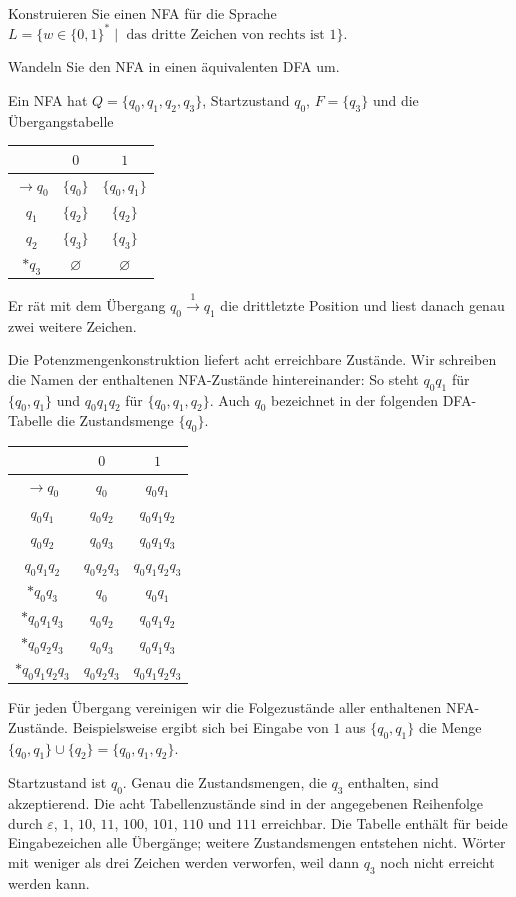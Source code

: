 \\
Konstruieren Sie einen NFA für die Sprache
$L = \{ w \in \{0,1\}^* \mid \text{ das dritte Zeichen von rechts ist } 1 \}$.

Wandeln Sie den NFA in einen äquivalenten DFA um.

\begin{loesung}

Ein NFA hat $Q=\{q_0,q_1,q_2,q_3\}$, Startzustand $q_0$,
$F=\{q_3\}$ und die Übergangstabelle
\begin{center}
\begin{tabular}{c|cc}
 & $0$ & $1$\\\hline
$\to q_0$ & $\{q_0\}$ & $\{q_0,q_1\}$\\
$q_1$ & $\{q_2\}$ & $\{q_2\}$\\
$q_2$ & $\{q_3\}$ & $\{q_3\}$\\
$*q_3$ & $\varnothing$ & $\varnothing$
\end{tabular}
\end{center}
Er rät mit dem Übergang $q_0\xrightarrow{1}q_1$ die drittletzte Position
und liest danach genau zwei weitere Zeichen.

Die Potenzmengenkonstruktion liefert acht erreichbare Zustände.
Wir schreiben die Namen der enthaltenen NFA-Zustände hintereinander:
So steht $q_0q_1$ für $\{q_0,q_1\}$ und $q_0q_1q_2$ für
$\{q_0,q_1,q_2\}$. Auch $q_0$ bezeichnet in der folgenden DFA-Tabelle
die Zustandsmenge $\{q_0\}$.
\begin{center}
\begin{tabular}{c|cc}
 & $0$ & $1$\\\hline
$\to q_0$ & $q_0$ & $q_0q_1$\\
$q_0q_1$ & $q_0q_2$ & $q_0q_1q_2$\\
$q_0q_2$ & $q_0q_3$ & $q_0q_1q_3$\\
$q_0q_1q_2$ & $q_0q_2q_3$ & $q_0q_1q_2q_3$\\
$*q_0q_3$ & $q_0$ & $q_0q_1$\\
$*q_0q_1q_3$ & $q_0q_2$ & $q_0q_1q_2$\\
$*q_0q_2q_3$ & $q_0q_3$ & $q_0q_1q_3$\\
$*q_0q_1q_2q_3$ & $q_0q_2q_3$ & $q_0q_1q_2q_3$
\end{tabular}
\end{center}
Für jeden Übergang vereinigen wir die Folgezustände aller enthaltenen
NFA-Zustände. Beispielsweise ergibt sich bei Eingabe von $1$ aus
$\{q_0,q_1\}$ die Menge $\{q_0,q_1\}\cup\{q_2\}=\{q_0,q_1,q_2\}$.

Startzustand ist $q_0$. Genau die Zustandsmengen, die $q_3$ enthalten,
sind akzeptierend. Die acht Tabellenzustände sind in der angegebenen
Reihenfolge durch $\varepsilon$, $1$, $10$, $11$, $100$, $101$, $110$ und $111$
erreichbar. Die Tabelle enthält für beide Eingabezeichen alle Übergänge;
weitere Zustandsmengen entstehen nicht.
Wörter mit weniger als drei Zeichen werden verworfen, weil dann $q_3$
noch nicht erreicht werden kann.
\end{loesung}

